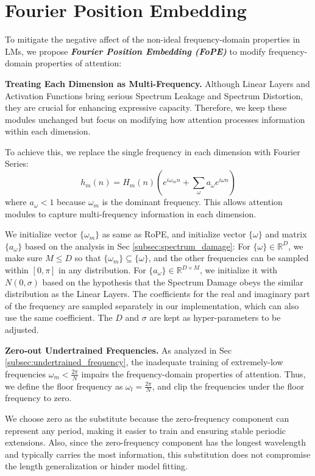 \section{Fourier Position Embedding}
To mitigate the negative affect of the non-ideal frequency-domain properties in LMs, we propose \textit{\textbf{Fourier Position Embedding (FoPE)}} to modify frequency-domain properties of attention:

\textbf{Treating Each Dimension as Multi-Frequency.} Although Linear Layers and Activation Functions bring serious Spectrum Leakage and Spectrum Distortion, they are crucial for enhancing expressive capacity. Therefore, we keep these modules unchanged but focus on modifying how attention processes information within each dimension.

To achieve this, we replace the single frequency in each dimension with Fourier Series:
\begin{equation}
    h_m(n) = H_m(n)(e^{i\omega_m n}+\sum\limits_{\omega}a_{\omega} e^{i\omega n})
\end{equation}
where $a_\omega<1$ because $\omega_m$ is the dominant frequency. This allows attention modules to capture multi-frequency information in each dimension. 

We initialize vector $\{\omega_m\}$ as same as RoPE, and initialize vector $\{\omega\}$ and matrix $\{a_\omega\}$ based on the analysis in Sec \ref{subsec:spectrum_damage}: 
For $\{\omega\}\in\mathbb{R}^D$, we make sure $M \leq D$ so that $\{\omega_m\}\subseteq\{\omega\}$, and the other frequencies can be sampled within $[0, \pi]$ in any distribution.
For $\{a_\omega\}\in\mathbb{R}^{D \times M}$, we initialize it with $N(0,\sigma)$ based on the hypothesis that the Spectrum Damage obeys the similar distribution as the Linear Layers. The coefficients for the real and imaginary part of the frequency are sampled separately in our implementation, which can also use the same coefficient.
The $D$ and $\sigma$ are kept as hyper-parameters to be adjusted.

\textbf{Zero-out Undertrained Frequencies.} As analyzed in Sec \ref{subsec:undertrained_frequency}, the inadequate training of extremely-low frequencies $\omega_m<\frac{2\pi}{N}$ impairs the frequency-domain properties of attention. Thus, we define the floor frequency as $\omega_l=\frac{2\pi}{N}$, and clip the frequencies under the floor frequency to zero. 

We choose zero as the substitute because the zero-frequency component can represent any period, making it easier to train and ensuring stable periodic extensions. Also, since the zero-frequency component has the longest wavelength and typically carries the most information, this substitution does not compromise the length generalization or hinder model fitting.

